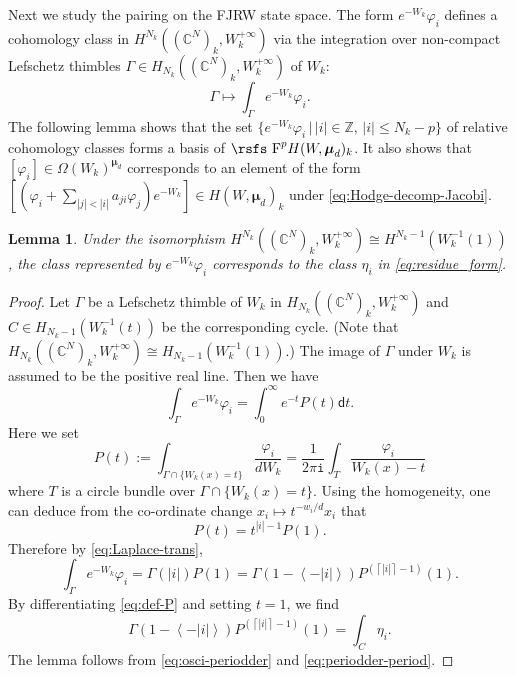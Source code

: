 \documentclass[11pt]{amsart}
\newtheorem{lem}[thm]{Lemma} %
\theoremstyle{definition} %
\theoremstyle{remark} %
\newcommand{\CC}{\mathbb C}
\newcommand{\ZZ}{\mathbb Z}
\def\fracp#1{\left\langle #1 \right\rangle}
\def\ceil#1{\left \lceil #1 \right \rceil}
\newcommand{\marsfs}[1]{\mbox{\rsfs #1}}
\newcommand{\bmu}{\boldsymbol{\mu}}
\newcommand{\dd}{\mathsf{d}}
\newcommand{\iu}{\mathtt{i}}
\newcommand{\rsF}{\marsfs{F}}
\begin{document}
Next we study the pairing on the FJRW state space.  
The form $e^{-W_k} \varphi_i$ 
defines a cohomology class in 
$H^{N_k}((\CC^N)_k,W_k^{+\infty})$ 
via the integration over non-compact 
Lefschetz thimbles $\Gamma
\in H_{N_k}((\CC^N)_k,W_k^{+\infty})$ of $W_k$: 
\[
\Gamma \longmapsto \int_{\Gamma} e^{-W_k} \varphi_i.  
\]
The following lemma shows that the set 
$\{e^{-W_k} \varphi_i \,|\, |i|\in \ZZ, \, 
|i|\le N_k-p\}$ 
of relative cohomology classes 
forms a basis of $\rsF^p H(W,\bmu_d)_k$. 
It also shows that $[\varphi_i]\in \Omega(W_k)^{\bmu_d}$ 
corresponds to an element of the form 
$[(\varphi_i + \sum_{|j|<|i|} a_{ji} \varphi_j) e^{-W_k}] 
\in H(W,\bmu_d)_k$ 
under \eqref{eq:Hodge-decomp-Jacobi}. 
\begin{lem} 
Under the isomorphism 
$H^{N_k}((\CC^N)_k,W^{+\infty}_k) \cong 
H^{N_k-1}(W_k^{-1}(1))$, 
the class represented by $e^{-W_k} \varphi_i$  
corresponds to the class 
$\eta_i$ in \eqref{eq:residue_form}. 
\end{lem} 
\begin{proof} 
Let $\Gamma$ be a Lefschetz thimble of $W_k$ 
in $H_{N_k}((\CC^N)_k,W^{+\infty}_k)$ 
and $C \in H_{N_k-1}(W_k^{-1}(t))$ be the 
corresponding cycle. 
(Note that $H_{N_k}((\CC^N)_k,W^{+\infty}_k)
\cong  H_{N_k-1}(W_k^{-1}(1))$.) 
The image of $\Gamma$ under $W_k$ is assumed to be 
the positive real line. 
Then we have 
\begin{equation}
\label{eq:Laplace-trans}  
\int_\Gamma e^{-W_k} \varphi_i 
= \int_0^\infty e^{-t} P(t) \dd t.  
\end{equation} 
Here we set 
\begin{equation} 
\label{eq:def-P} 
P(t):= \int_{\Gamma \cap \{W_k(x)=t\}} \frac{\varphi_i}{dW_k} 
= \frac{1}{2\pi\iu} \int_{T} 
\frac{\varphi_i}{W_k(x)-t}
\end{equation} 
where $T$ is a circle bundle over $\Gamma\cap \{W_k(x)=t\}$. 
Using the homogeneity, one can deduce 
from the co-ordinate change $x_i \mapsto t^{-w_i/d} x_i$ 
that 
\begin{equation*} 
P(t) = t^{|i|-1} P(1). 
\end{equation*} 
Therefore by \eqref{eq:Laplace-trans}, 
\begin{equation} 
\label{eq:osci-periodder} 
\int_\Gamma e^{-W_k} \varphi_i = \Gamma(|i|) P(1) 
= \Gamma(1-\fracp{-|i|})P^{(\ceil{|i|}-1)}(1).  
\end{equation} 
By differentiating \eqref{eq:def-P} and setting $t=1$, we find 
\begin{equation} 
\label{eq:periodder-period} 
\Gamma(1-\fracp{-|i|})
P^{(\ceil{|i|}-1)}(1) =  \int_C \eta_i.  
\end{equation} 
The lemma follows from \eqref{eq:osci-periodder} and 
\eqref{eq:periodder-period}. 
\end{proof} 
\end{document}
